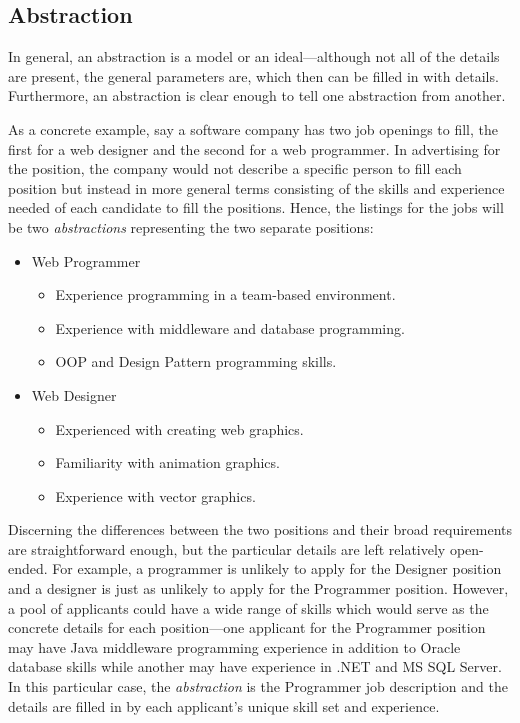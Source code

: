 \documentclass[12pt]{report}
\begin{document}
\subsection{Abstraction}
\begin{doublespace}
In general, an abstraction is a model or an ideal---although not all of the details are present, the general parameters are, which then can be filled in with details. Furthermore, an abstraction is clear enough to tell one abstraction from another. 

As a concrete example, say a software company has two job openings to fill, the first for a web designer and the second for a web programmer. In advertising for the position, the company would not describe a specific person to fill each position but instead in more general terms consisting of the skills and experience needed of each candidate to fill the positions. Hence, the listings for the jobs will be two \textit{abstractions} representing the two separate positions:

\begin{itemize}
\item Web Programmer
\begin{itemize}
\item Experience programming in a team-based environment.
\item Experience with middleware and database programming.
\item OOP and Design Pattern programming skills.
\end{itemize}
\item Web Designer
\begin{itemize}
\item Experienced with creating web graphics.
\item Familiarity with animation graphics.
\item Experience with vector graphics.
\end{itemize}
\end{itemize}

Discerning the differences between the two positions and their broad requirements are straightforward enough, but the particular details are left relatively open-ended. For example, a programmer is unlikely to apply for the Designer position and a designer is just as unlikely to apply for the Programmer position. However, a pool of applicants could have a wide range of skills which would serve as the concrete details for each position---one applicant for the Programmer position may have Java middleware programming experience in addition to Oracle database skills while another may have experience in .NET and MS SQL Server. In this particular case, the \textit{abstraction} is the Programmer job description and the details are filled in by each applicant's unique skill set and experience.


\end{doublespace}
\end{document}
